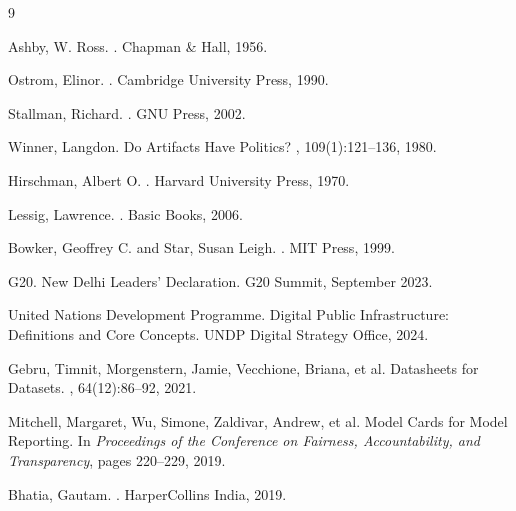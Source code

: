 \documentclass{article}
\begin{document}

\begin{thebibliography}{9}

Ashby, W. Ross.
.
\newblock Chapman \& Hall, 1956.

Ostrom, Elinor.
.
\newblock Cambridge University Press, 1990.

Stallman, Richard.
.
\newblock GNU Press, 2002.

Winner, Langdon.
\newblock Do Artifacts Have Politics?
, 109(1):121--136, 1980.

Hirschman, Albert O.
.
\newblock Harvard University Press, 1970.

Lessig, Lawrence.
.
\newblock Basic Books, 2006.

Bowker, Geoffrey C. and Star, Susan Leigh.
.
\newblock MIT Press, 1999.

G20.
\newblock New Delhi Leaders' Declaration.
\newblock G20 Summit, September 2023.

United Nations Development Programme.
\newblock Digital Public Infrastructure: Definitions and Core Concepts.
\newblock UNDP Digital Strategy Office, 2024.

Gebru, Timnit, Morgenstern, Jamie, Vecchione, Briana, et al.
\newblock Datasheets for Datasets.
, 64(12):86--92, 2021.

Mitchell, Margaret, Wu, Simone, Zaldivar, Andrew, et al.
\newblock Model Cards for Model Reporting.
\newblock In {\em Proceedings of the Conference on Fairness, Accountability, and Transparency}, pages 220--229, 2019.

Bhatia, Gautam.
.
\newblock HarperCollins India, 2019.


\end{thebibliography}
\end{document}
